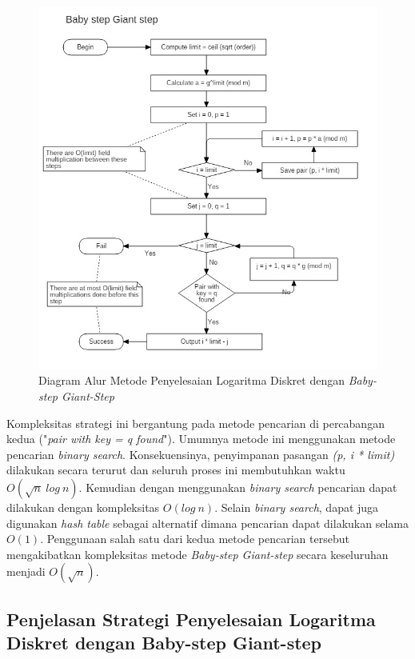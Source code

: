 \begin{figure}
	\Centering
	\includegraphics[scale=0.44]{bab2/img/bsgs}
	\caption{Diagram Alur Metode Penyelesaian Logaritma Diskret dengan \textit{Baby-step Giant-Step}}
	\label{fig:bsgs}
\end{figure}

Kompleksitas strategi ini bergantung pada metode pencarian di percabangan kedua ("\textit{pair with key = q found}"). Umumnya metode ini menggunakan metode pencarian \textit{binary search}. Konsekuensinya, penyimpanan pasangan \textit{(p, i * limit)} dilakukan secara terurut dan seluruh proses ini membutuhkan waktu $ O(\sqrt{n}\ log\ n) $. Kemudian dengan menggunakan \textit{binary search} pencarian dapat dilakukan dengan kompleksitas $ O(log\ n) $. Selain \textit{binary search}, dapat juga digunakan \textit{hash table} sebagai alternatif dimana pencarian dapat dilakukan selama $ O(1) $. Penggunaan salah satu dari kedua metode pencarian tersebut mengakibatkan kompleksitas metode \textit{Baby-step Giant-step} secara keseluruhan menjadi $ O(\sqrt{n}) $.

\subsection {Penjelasan Strategi Penyelesaian Logaritma Diskret dengan Baby-step Giant-step}

